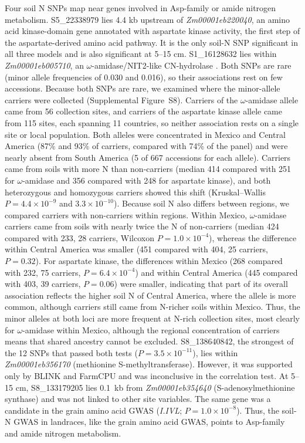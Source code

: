 \documentclass[namedate,unnumsec,webpdf,contemporary,large]{oup-authoring-template}
\begin{document}
Four soil N SNPs map near genes involved in Asp-family or amide nitrogen metabolism. S5\_22338979 lies 4.4 kb upstream of \textit{Zm00001eb220040}, an amino acid kinase-domain gene annotated with aspartate kinase activity, the first step of the aspartate-derived amino acid pathway. It is the only soil-N SNP significant in all three models and is also significant at 5--15 cm. S1\_16128632 lies within \textit{Zm00001eb005710}, an $\omega$-amidase/NIT2-like CN-hydrolase \citep{Zhang2014OmegaAmidase}. Both SNPs are rare (minor allele frequencies of 0.030 and 0.016), so their associations rest on few accessions. Because both SNPs are rare, we examined where the minor-allele carriers were collected (Supplemental Figure~S8). Carriers of the $\omega$-amidase allele came from 56 collection sites, and carriers of the aspartate kinase allele came from 115 sites, each spanning 11 countries, so neither association rests on a single site or local population. Both alleles were concentrated in Mexico and Central America (87\% and 93\% of carriers, compared with 74\% of the panel) and were nearly absent from South America (5 of 667 accessions for each allele). Carriers came from soils with more N than non-carriers (median 414 compared with 251 for $\omega$-amidase and 356 compared with 248 for aspartate kinase), and both heterozygous and homozygous carriers showed this shift (Kruskal--Wallis $P = 4.4 \times 10^{-9}$ and $3.3 \times 10^{-10}$). Because soil N also differs between regions, we compared carriers with non-carriers within regions. Within Mexico, $\omega$-amidase carriers came from soils with nearly twice the N of non-carriers (median 424 compared with 233, 28 carriers, Wilcoxon $P = 1.0 \times 10^{-4}$), whereas the difference within Central America was smaller (451 compared with 404, 25 carriers, $P = 0.32$). For aspartate kinase, the differences within Mexico (268 compared with 232, 75 carriers, $P = 6.4 \times 10^{-4}$) and within Central America (445 compared with 403, 39 carriers, $P = 0.06$) were smaller, indicating that part of its overall association reflects the higher soil N of Central America, where the allele is more common, although carriers still came from N-richer soils within Mexico. Thus, the minor alleles at both loci are more frequent at N-rich collection sites, most clearly for $\omega$-amidase within Mexico, although the regional concentration of carriers means that shared ancestry cannot be excluded. S8\_138640842, the strongest of the 12 SNPs that passed both tests ($P = 3.5\times10^{-11}$), lies within \textit{Zm00001eb356170} (methionine S-methyltransferase). However, it was supported only by BLINK and FarmCPU and was inconclusive in the correlation test. At 5--15 cm, S8\_133179205 lies 0.1~kb from \textit{Zm00001eb354640} (S-adenosylmethionine synthase) and was not linked to other site variables. The same gene was a candidate in the grain amino acid GWAS (\textit{I.IVL}; $P = 1.0 \times 10^{-8}$). Thus, the soil-N GWAS in landraces, like the grain amino acid GWAS, points to Asp-family and amide nitrogen metabolism.
\end{document}
